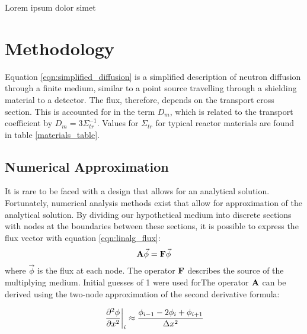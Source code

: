 \documentclass[../main.tex]{subfiles}
\begin{document}
Lorem ipsum dolor simet

\section{Methodology}
	Equation \ref{eqn:simplified_diffusion} is a simplified description of neutron diffusion through a finite medium, similar to a point source travelling through a shielding material to a detector. The flux, therefore, depends on the transport cross section. This is accounted for in the term $D_m$, which is related to the transport coefficient by $D_m = 3 \Sigma_{tr}^{-1}$. Values for $\Sigma_{tr}$ for typical reactor materials are found in table \ref{materials_table}. 

	
\subsection{Numerical Approximation} \label{ssec:numerical}
	It is rare to be faced with a design that allows for an analytical solution. Fortunately, numerical analysis methods exist that allow for approximation of the analytical solution. By dividing our hypothetical medium into discrete sections with nodes at the boundaries between these sections, it is possible to express the flux vector with equation \ref{eqn:linalg_flux}:
	\begin{equation}
		\mathbf{A} \vec{\phi} = \mathbf{F} \vec{\phi}
		\label{eqn:linalg_flux}
	\end{equation}
	where $\vec{\phi}$ is the flux at each node. The operator $\mathbf{F}$ describes the source of the multiplying medium.  Initial guesses of 1 were used forThe operator $\mathbf{A}$ can be derived using the two-node approximation of the  second derivative formula:
	
	\begin{equation*}
		\left. \pdv[2]{\phi}{x} \right|_i \approx \frac{\phi_{i-1} - 2\phi_i + \phi_{i+1}}{\Delta x^2}
	\end{equation*}
\end{document}
